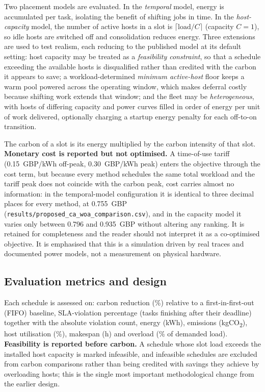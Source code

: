 \documentclass[12pt,a4paper]{article}
\begin{document}
Two placement models are evaluated. In the \emph{temporal} model, energy is accumulated per task, isolating
the benefit of shifting jobs in time. In the \emph{host-capacity} model, the number of active hosts in a slot
is $\lceil \text{load}/C \rceil$ (capacity $C=1$), so idle hosts are switched off and consolidation reduces
energy. Three extensions are used to test realism, each reducing to the published model at its default
setting: host capacity may be treated as a \emph{feasibility constraint}, so that a schedule exceeding the
available hosts is disqualified rather than credited with the carbon it appears to save; a
workload-determined \emph{minimum active-host} floor keeps a warm pool powered across the operating window,
which makes deferral costly because shifting work extends that window; and the fleet may be
\emph{heterogeneous}, with hosts of differing capacity and power curves filled in order of energy per unit of
work delivered, optionally charging a startup energy penalty for each off-to-on transition.

The carbon of a slot is its energy multiplied by the carbon intensity of that slot. \textbf{Monetary cost is
reported but not optimised.} A time-of-use tariff (0.15~GBP/kWh off-peak, 0.30~GBP/kWh peak) enters the
objective through the cost term, but because every method schedules the same total workload and the tariff
peak does not coincide with the carbon peak, cost carries almost no information: in the temporal-model
configuration it is identical to three decimal places for every method, at 0.755~GBP
(\texttt{results/proposed\_ca\_woa\_comparison.csv}), and in the capacity model it varies only between 0.796
and 0.935~GBP without altering any ranking. It is retained for
completeness and the reader should not interpret it as a co-optimised objective. It is emphasised that this is
a simulation driven by real traces and documented power models, not a measurement on physical hardware.

\subsection{Evaluation metrics and design}
Each schedule is assessed on: carbon reduction (\%) relative to a first-in-first-out (FIFO) baseline,
SLA-violation percentage (tasks finishing after their deadline) together with the absolute violation count,
energy (kWh), emissions (kgCO\textsubscript{2}), host utilisation (\%), makespan (h) and overload (\% of
demanded load). \textbf{Feasibility is reported before carbon.} A schedule whose slot load exceeds the
installed host capacity is marked infeasible, and infeasible schedules are excluded from carbon comparisons
rather than being credited with savings they achieve by overloading hosts; this is the single most important
methodological change from the earlier design.
\end{document}
